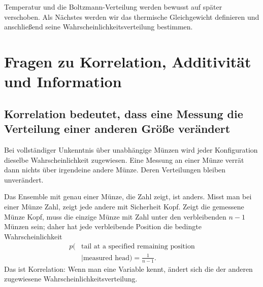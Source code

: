 \begin{classroomqa}
\end{classroomqa}

Temperatur und die Boltzmann-Verteilung werden bewusst auf später verschoben. Als Nächstes
werden wir das thermische Gleichgewicht definieren und anschließend seine
Wahrscheinlichkeitsverteilung bestimmen.

\section{Fragen zu Korrelation, Additivität und Information}

\subsection{Korrelation bedeutet, dass eine Messung die Verteilung einer anderen Größe verändert}

Bei vollständiger Unkenntnis über unabhängige Münzen wird jeder Konfiguration dieselbe
Wahrscheinlichkeit zugewiesen. Eine Messung an einer Münze verrät dann nichts über irgendeine
andere Münze. Deren Verteilungen bleiben unverändert.

Das Ensemble mit genau einer Münze, die Zahl zeigt, ist anders. Misst man bei einer Münze Zahl,
zeigt jede andere mit Sicherheit Kopf. Zeigt die gemessene Münze Kopf, muss die einzige Münze mit Zahl
unter den verbleibenden \(n-1\) Münzen sein; daher hat jede verbleibende Position die bedingte Wahrscheinlichkeit
\begin{equation}
\begin{aligned}
 p(&\text{tail at a specified remaining position}\\
   &\mid\text{measured head})=\frac{1}{n-1}.
\end{aligned}
 \label{eq:sm1-conditional-tail}
\end{equation}
Das ist Korrelation: Wenn man eine Variable kennt, ändert sich die der anderen zugewiesene
Wahrscheinlichkeitsverteilung.

\begin{classroomqa}
\end{classroomqa}

